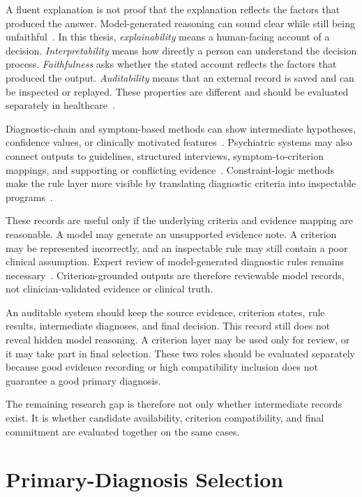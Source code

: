 A fluent explanation is not proof that the explanation reflects the factors that produced the answer. Model-generated reasoning can sound clear while still being unfaithful~\citep{turpin2023unfaithful}. In this thesis, \emph{explainability} means a human-facing account of a decision. \emph{Interpretability} means how directly a person can understand the decision process. \emph{Faithfulness} asks whether the stated account reflects the factors that produced the output. \emph{Auditability} means that an external record is saved and can be inspected or replayed. These properties are different and should be evaluated separately in healthcare~\citep{rudin2019stop,huang2024xiai}.

Diagnostic-chain and symptom-based methods can show intermediate hypotheses, confidence values, or clinically motivated features~\citep{chen2025cod,lee2026interpretable,lyu2026depllm}. Psychiatric systems may also connect outputs to guidelines, structured interviews, symptom-to-criterion mappings, and supporting or conflicting evidence~\citep{li2026mind,bi2025magi,ozgun2025dsm5agentflow}. Constraint-logic methods make the rule layer more visible by translating diagnostic criteria into inspectable programs~\citep{kim2025clp}.

These records are useful only if the underlying criteria and evidence mapping are reasonable. A model may generate an unsupported evidence note. A criterion may be represented incorrectly, and an inspectable rule may still contain a poor clinical assumption. Expert review of model-generated diagnostic rules remains necessary~\citep{kim2025clp}. Criterion-grounded outputs are therefore reviewable model records, not clinician-validated evidence or clinical truth.

An auditable system should keep the source evidence, criterion states, rule results, intermediate diagnoses, and final decision. This record still does not reveal hidden model reasoning. A criterion layer may be used only for review, or it may take part in final selection. These two roles should be evaluated separately because good evidence recording or high compatibility inclusion does not guarantee a good primary diagnosis.

The remaining research gap is therefore not only whether intermediate records exist. It is whether candidate availability, criterion compatibility, and final commitment are evaluated together on the same cases.

\section{Primary-Diagnosis Selection}

